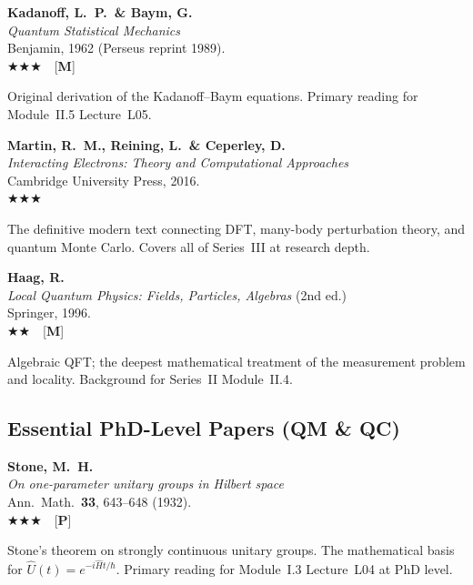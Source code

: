 \documentclass[11pt,a4paper]{article}
\newcommand{\essential}{$\bigstar\bigstar\bigstar$}
\newcommand{\recommended}{$\bigstar\bigstar$}
\newenvironment{bibentry}[1]{%
  \begin{tcolorbox}[entrybox=#1, top=4pt, bottom=4pt]%
}{%
  \end{tcolorbox}\smallskip%
}
\begin{document}
\begin{bibentry}{t5light}
\textbf{Kadanoff, L.~P.\ \& Baym, G.}\\
\textit{Quantum Statistical Mechanics}\\
Benjamin, 1962 (Perseus reprint 1989).\\[4pt]
\essential\ \ [\textbf{M}]\\[4pt]
\begin{tcolorbox}[annotbox]
Original derivation of the Kadanoff--Baym equations. Primary reading for
Module~II.5 Lecture~L05.
\end{tcolorbox}
\end{bibentry}

\begin{bibentry}{t5light}
\textbf{Martin, R.~M., Reining, L.\ \& Ceperley, D.}\\
\textit{Interacting Electrons: Theory and Computational Approaches}\\
Cambridge University Press, 2016.\\[4pt]
\essential\\[4pt]
\begin{tcolorbox}[annotbox]
The definitive modern text connecting DFT, many-body perturbation theory, and
quantum Monte Carlo. Covers all of Series~III at research depth.
\end{tcolorbox}
\end{bibentry}

\begin{bibentry}{t5light}
\textbf{Haag, R.}\\
\textit{Local Quantum Physics: Fields, Particles, Algebras} (2nd ed.)\\
Springer, 1996.\\[4pt]
\recommended\ \ [\textbf{M}]\\[4pt]
\begin{tcolorbox}[annotbox]
Algebraic QFT; the deepest mathematical treatment of the measurement problem
and locality. Background for Series~II Module~II.4.
\end{tcolorbox}
\end{bibentry}

\subsection{Essential PhD-Level Papers (QM \& QC)}

\begin{bibentry}{t5light}
\textbf{Stone, M.~H.}\\
\textit{On one-parameter unitary groups in Hilbert space}\\
Ann.~Math.~\textbf{33}, 643--648 (1932).\\[4pt]
\essential\ \ [\textbf{P}]\\[4pt]
\begin{tcolorbox}[annotbox]
Stone's theorem on strongly continuous unitary groups. The mathematical basis
for $\hat{U}(t)=e^{-i\hat{H}t/\hbar}$. Primary reading for Module~I.3
Lecture~L04 at PhD level.
\end{tcolorbox}
\end{bibentry}
\end{document}
